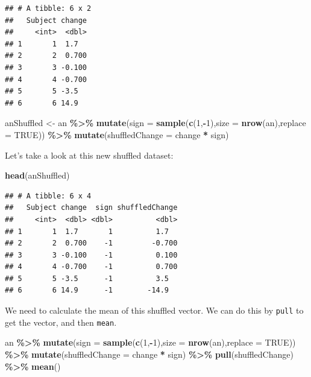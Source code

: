 \documentclass[
  a4paperpaper,
]{book}
\newenvironment{Shaded}{\begin{snugshade}}{\end{snugshade}}
\newcommand{\DataTypeTok}[1]{\textcolor[rgb]{0.13,0.29,0.53}{#1}}
\newcommand{\DecValTok}[1]{\textcolor[rgb]{0.00,0.00,0.81}{#1}}
\newcommand{\KeywordTok}[1]{\textcolor[rgb]{0.13,0.29,0.53}{\textbf{#1}}}
\newcommand{\NormalTok}[1]{#1}
\newcommand{\OperatorTok}[1]{\textcolor[rgb]{0.81,0.36,0.00}{\textbf{#1}}}
\newcommand{\OtherTok}[1]{\textcolor[rgb]{0.56,0.35,0.01}{#1}}
\newcommand{\StringTok}[1]{\textcolor[rgb]{0.31,0.60,0.02}{#1}}
\begin{document}
\begin{verbatim}
## # A tibble: 6 x 2
##   Subject change
##     <int>  <dbl>
## 1       1  1.7  
## 2       2  0.700
## 3       3 -0.100
## 4       4 -0.700
## 5       5 -3.5  
## 6       6 14.9
\end{verbatim}

\begin{Shaded}
\begin{Highlighting}[]
\NormalTok{anShuffled \textless{}{-}}\StringTok{ }\NormalTok{an }\OperatorTok{\%\textgreater{}\%}
\StringTok{  }\KeywordTok{mutate}\NormalTok{(}\DataTypeTok{sign =} \KeywordTok{sample}\NormalTok{(}\KeywordTok{c}\NormalTok{(}\DecValTok{1}\NormalTok{,}\OperatorTok{{-}}\DecValTok{1}\NormalTok{),}\DataTypeTok{size =} \KeywordTok{nrow}\NormalTok{(an),}\DataTypeTok{replace =} \OtherTok{TRUE}\NormalTok{)) }\OperatorTok{\%\textgreater{}\%}
\StringTok{  }\KeywordTok{mutate}\NormalTok{(}\DataTypeTok{shuffledChange =}\NormalTok{ change }\OperatorTok{*}\StringTok{ }\NormalTok{sign)}
\end{Highlighting}
\end{Shaded}

Let's take a look at this new shuffled dataset:

\begin{Shaded}
\begin{Highlighting}[]
\KeywordTok{head}\NormalTok{(anShuffled)}
\end{Highlighting}
\end{Shaded}

\begin{verbatim}
## # A tibble: 6 x 4
##   Subject change  sign shuffledChange
##     <int>  <dbl> <dbl>          <dbl>
## 1       1  1.7       1          1.7  
## 2       2  0.700    -1         -0.700
## 3       3 -0.100    -1          0.100
## 4       4 -0.700    -1          0.700
## 5       5 -3.5      -1          3.5  
## 6       6 14.9      -1        -14.9
\end{verbatim}

We need to calculate the mean of this shuffled vector. We can do this by \texttt{pull} to get the vector, and then \texttt{mean}.

\begin{Shaded}
\begin{Highlighting}[]
\NormalTok{an }\OperatorTok{\%\textgreater{}\%}
\StringTok{  }\KeywordTok{mutate}\NormalTok{(}\DataTypeTok{sign =} \KeywordTok{sample}\NormalTok{(}\KeywordTok{c}\NormalTok{(}\DecValTok{1}\NormalTok{,}\OperatorTok{{-}}\DecValTok{1}\NormalTok{),}\DataTypeTok{size =} \KeywordTok{nrow}\NormalTok{(an),}\DataTypeTok{replace =} \OtherTok{TRUE}\NormalTok{)) }\OperatorTok{\%\textgreater{}\%}
\StringTok{  }\KeywordTok{mutate}\NormalTok{(}\DataTypeTok{shuffledChange =}\NormalTok{ change }\OperatorTok{*}\StringTok{ }\NormalTok{sign) }\OperatorTok{\%\textgreater{}\%}
\StringTok{  }\KeywordTok{pull}\NormalTok{(shuffledChange) }\OperatorTok{\%\textgreater{}\%}
\StringTok{  }\KeywordTok{mean}\NormalTok{()}
\end{Highlighting}
\end{Shaded}
\end{document}
